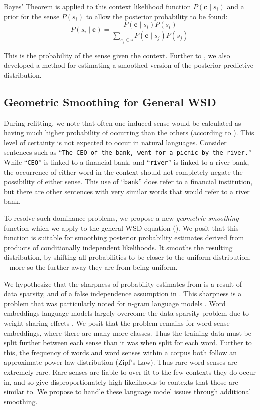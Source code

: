 \documentclass{llncs}
\def\parencite{\cite}
\renewcommand{\c}{\mathbf{c}}
\newcommand{\s}{\mathbf{s}}
\newcommand{\wordquote}[1]{\enquote{\texttt{#1}}}
\begin{document}
Bayes' Theorem is applied to this context likelihood function  $P(\c \mid s_{i})$ and a prior for the sense $P(s_i)$ to allow the posterior probability to be found:
\begin{equation} \label{eq:generalwsd}
P(s_{i} \mid \c) =
\dfrac{P(\c \mid s_{i})P(s_{i})}
{\sum_{s_{j}\in\s} P(\c \mid s_{j})P(s_{j})}
\end{equation}

This is the probability of the sense given the context.
Further to , we also developed a method for estimating a smoothed version of the posterior predictive distribution.


\subsection{Geometric Smoothing for General WSD} \label{smoothing}


During refitting, we note that often one induced sense would be calculated as having much higher probability of occurring than the others (according to ).
This level of certainty is not expected to occur in natural languages. 
Consider sentences such as \wordquote{The CEO of the bank, went for a picnic by the river.} 
While \wordquote{CEO} is linked to a financial bank, and \wordquote{river} is linked to a river bank, the occurrence of either word in the context should not completely negate the possibility of either sense.
This use of \wordquote{bank} does refer to a financial institution, but there are other sentences with very similar words that would refer to a river bank.

To resolve such dominance problems, we propose a new \emph{geometric smoothing} function which we apply to the general WSD equation ().
We posit that this function is suitable for smoothing posterior probability estimates derived from products of conditionally independent likelihoods.
It smooths the resulting distribution, by shifting all probabilities to be closer to the uniform distribution,  -- more-so the further away they are from being uniform.

We hypothesize that the sharpness of probability estimates from  is a result of data sparsity, and of a false independence assumption in .
This sharpness is a problem that was particularly noted for n-gram language models \cite{rosenfeld2000two}.
Word  embeddings language models largely overcome the data sparsity problem due to weight sharing effects \parencite{NPLM}.
We posit that the problem remains for word sense embeddings, where there are many more classes.
Thus the training data must be split further between each sense than it was when split for each word. 
Further to this, the frequency of words \parencite{zipf1949human}  and word senses \parencite{Kilgarriff2004} within a corpus both follow an approximate power law distribution (Zipf's Law).
Thus rare word senses are extremely rare.
Rare senses are liable to over-fit to the few contexts they do occur in, and so give disproportionately high likelihoods to contexts that those are similar to.
We propose to handle these language model issues through additional smoothing.
\end{document}
